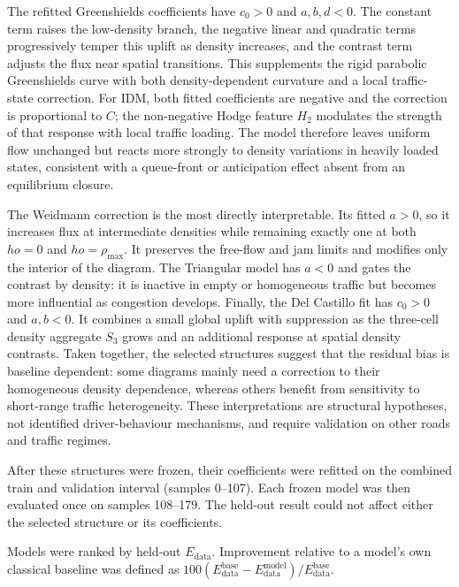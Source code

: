 The refitted Greenshields coefficients have $c_0>0$ and $a,b,d<0$. The
constant term raises the low-density branch, the negative linear and quadratic
terms progressively temper this uplift as density increases, and the contrast
term adjusts the flux near spatial transitions. This supplements the rigid
parabolic Greenshields curve with both density-dependent curvature and a local
traffic-state correction. For IDM, both fitted coefficients are negative and
the correction is proportional to $C$; the non-negative Hodge feature $H_2$
modulates the strength of that response with local traffic loading. The model
therefore leaves uniform flow unchanged but reacts more strongly to density
variations in heavily loaded states, consistent with a queue-front or
anticipation effect absent from an equilibrium closure.

The Weidmann correction is the most directly interpretable. Its fitted
$a>0$, so it increases flux at intermediate densities while remaining exactly
one at both $
ho=0$ and $
ho=\rho_{\max}$. It preserves the free-flow and jam
limits and modifies only the interior of the diagram. The Triangular model has
$a<0$ and gates the contrast by density: it is inactive in empty or homogeneous
traffic but becomes more influential as congestion develops. Finally, the Del
Castillo fit has $c_0>0$ and $a,b<0$. It combines a small global uplift with
suppression as the three-cell density aggregate $S_3$ grows and an additional
response at spatial density contrasts. Taken together, the selected structures
suggest that the residual bias is baseline dependent: some diagrams mainly
need a correction to their homogeneous density dependence, whereas others
benefit from sensitivity to short-range traffic heterogeneity. These
interpretations are structural hypotheses, not identified driver-behaviour
mechanisms, and require validation on other roads and traffic regimes.

After these structures were frozen, their coefficients were refitted on the
combined train and validation interval (samples 0--107). Each frozen model was
then evaluated once on samples 108--179. The held-out result could not affect
either the selected structure or its coefficients.

Models were ranked by held-out $E_{\mathrm{data}}$. Improvement relative to a
model's own classical baseline was defined as
$100(E_{\mathrm{data}}^{\mathrm{base}}-E_{\mathrm{data}}^{\mathrm{model}})
/E_{\mathrm{data}}^{\mathrm{base}}$.

